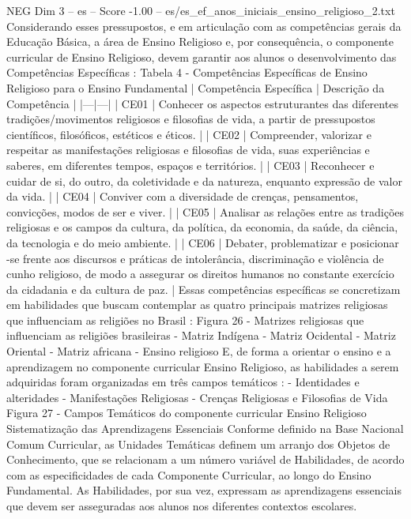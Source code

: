 \begin{textsample}{NEG Dim 3 – es – Score -1.00 – es/es\_ef\_anos\_iniciais\_ensino\_religioso\_2.txt}  \label{ex:f3_neg_179}
Considerando esses pressupostos, e em articulação com as competências gerais da Educação Básica, a área de Ensino Religioso e, por consequência, o componente curricular de Ensino Religioso, devem garantir aos alunos o desenvolvimento das Competências Específicas : Tabela 4 - Competências Específicas de Ensino Religioso para o Ensino Fundamental | Competência Específica | Descrição da Competência | |---|---| | CE01 | Conhecer os aspectos estruturantes das diferentes tradições/movimentos religiosos e filosofias de vida, a partir de pressupostos científicos, filosóficos, estéticos e éticos. | | CE02 | Compreender, valorizar e respeitar as manifestações religiosas e filosofias de vida, suas experiências e saberes, em diferentes tempos, espaços e territórios. | | CE03 | Reconhecer e cuidar de si, do outro, da coletividade e da natureza, enquanto expressão de valor da vida. | | CE04 | Conviver com a diversidade de crenças, pensamentos, convicções, modos de ser e viver. | | CE05 | Analisar as relações entre as tradições religiosas e os campos da cultura, da política, da economia, da saúde, da ciência, da tecnologia e do meio ambiente. | | CE06 | Debater, problematizar e posicionar -se frente aos discursos e práticas de intolerância, discriminação e violência de cunho religioso, de modo a assegurar os direitos humanos no constante exercício da cidadania e da cultura de paz. | Essas competências específicas se concretizam em habilidades que buscam contemplar as quatro principais matrizes religiosas que influenciam as religiões no Brasil : Figura 26 - Matrizes religiosas que influenciam as religiões brasileiras - Matriz Indígena - Matriz Ocidental - Matriz Oriental - Matriz africana - Ensino religioso E, de forma a orientar o ensino e a aprendizagem no componente curricular Ensino Religioso, as habilidades a serem adquiridas foram organizadas em três campos temáticos : - Identidades e alteridades - Manifestações Religiosas - Crenças Religiosas e Filosofias de Vida Figura 27 - Campos Temáticos do componente curricular Ensino Religioso Sistematização das Aprendizagens Essenciais Conforme definido na Base Nacional Comum Curricular, as Unidades Temáticas definem um arranjo dos Objetos de Conhecimento, que se relacionam a um número variável de Habilidades, de acordo com as especificidades de cada Componente Curricular, ao longo do Ensino Fundamental.
As Habilidades, por sua vez, expressam as aprendizagens essenciais que devem ser asseguradas aos alunos nos diferentes contextos escolares.

\end{textsample}
